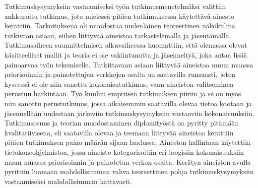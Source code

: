 Tutkimuskysymyksiin vastaamiseksi työn tutkimusmenetelmäksi valittiin ankkuroitu tutkimus, jota mielessä pitäen tutkimuksessa käytettävä ainesto kerättiin.
Tarkoituksena oli muodostaa uudenlainen teoreettinen näkökulma tutkivaan asiaan, siihen liittyvää aineistoa tarkastelemalla ja jäsentämällä.
Tutkimusaiheen suunnittelmisen alkuvaiheessa huomattiin, että olemassa olevat käsitteelliset mallit ja teoria ei ole vakiintunutta ja jäsenneltyä, joka antaa lisää painoarvoa työn tekemiselle.
Tutkittavaan asiaan liittyvää aineistoa muun muassa priorisoinnin ja painotettujen verkkojen osalta on saatavilla runsaasti, joten kyseessä ei ole niin sanottu kokonaisututkimus, vaan aineiston valitseminen perustuu harkintaan.
Työ kuuluu empriisen tutkimuksen piiriin ja se on myös niin sanottu perustutkimus, jossa aikaisemmin saatavilla olevaa tietoa kootaan ja jäsennellään uudestaan järkeviin tutkimuskysymyksiin vastaaviin kokonaisuuksiin.
Tutkimusosuus ja teorian muodostaminen diplomityöstä on pyritty pitämään kvalitatiivisena, eli saatavilla olevaa ja teemaan liittyvää aineistoa kerättiin pitäen tutkimuksen paino määrän sijaan laadussa.
Aineston hallintaan käytettiin tietokoneohjelmistoa, jossa aineisto kategorisoitiin eri loogisiin kokonaisuuksiin muun muassa priorisoinnin ja painotetun verkon osalta.
Kerätyn aineiston avulla pyrittiin luomaan mahdollisimman vahva teoreettinen pohja tutkimuskysymyksiin vastaamiseksi mahdollisimman kattavasti.
